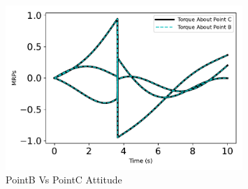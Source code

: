 \begin{figure}[htbp]\centerline{\includegraphics[width=0.8\textwidth]{AutoTeX/scPlusPointBVsPointCAttitude}}\caption{PointB Vs PointC Attitude}\label{fig:scPlusPointBVsPointCAttitude}\end{figure}